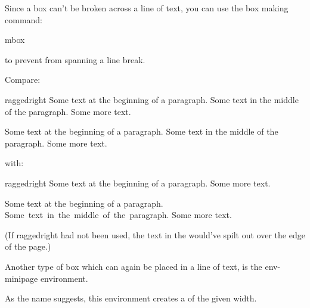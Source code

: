Since a box can't be broken across a line of text, you can use
the box making command:
\begin{definition}
\gls{mbox}
\end{definition}
to prevent  from spanning a line break.

Compare:
\begin{code}
\gls{raggedright}
Some text at the beginning of a paragraph. Some
text in the middle of the paragraph. Some more text.
\end{code}
\begin{result}
\raggedright
Some text at the beginning of a paragraph. Some text in the
middle of the paragraph. Some more text.
\par
\end{result}
with:
\begin{code}
\gls{raggedright}
Some text at the beginning of a paragraph.  Some more text.
\end{code}
\begin{result}
\raggedright
Some text at the beginning of a paragraph. \mbox{Some text in the
middle of the paragraph.} Some more text.
\par
\end{result}
(If \gls{raggedright} had not been used, the text in the 
would've spilt out over the edge of the page.)

Another type of box which can again be placed in a line of text,
is the \gls{env-minipage} environment.
\begin{definition}
%
\end{definition}
As the name suggests, this environment creates a 
of the given width.

